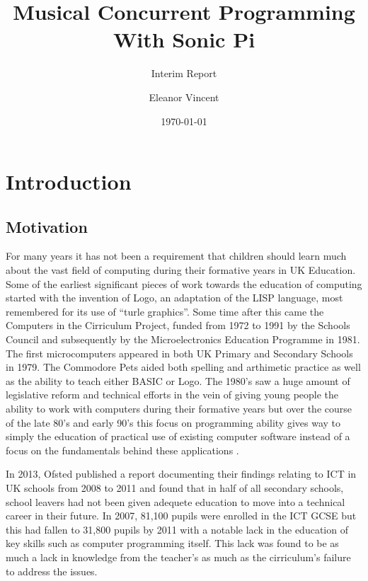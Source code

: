 \documentclass[11pt]{scrartcl}
\begin{document}
\title{Musical Concurrent Programming \\ With Sonic Pi}
\subtitle{Interim Report}
\author{Eleanor Vincent}
\date{\today}
\maketitle

\section{Introduction} %

\subsection{Motivation}
For many years it has not been a requirement that children should learn much
about the vast field of computing during their formative years in UK Education.
Some of the earliest significant pieces of work towards the education of
computing started with the invention of Logo, an adaptation of the LISP 
language, most remembered for its use of ``turle graphics''. Some time after 
this came the Computers in the Cirriculum Project, funded from 1972 to 1991 by 
the Schools Council and subsequently by the Microelectronics Education 
Programme in 1981. The first microcomputers appeared in both UK Primary and 
Secondary Schools in 1979. The Commodore Pets aided both spelling and 
arthimetic practice as well as the ability to teach either BASIC or Logo. The 
1980's saw a huge amount of legislative reform and technical efforts in the 
vein of giving young people the ability to work with computers during their 
formative years but over the course of the late 80's and early 90's this focus 
on programming ability gives way to simply the education of practical use of 
existing computer software instead of a focus on the fundamentals behind these 
applications \cite{naec}.

In 2013, Ofsted published a report documenting their findings relating to ICT 
in UK schools from 2008 to 2011 and found that in half of all secondary 
schools, school leavers had not been given adequete education to move into a 
technical career in their future. In 2007, 81,100 pupils were enrolled in the 
ICT GCSE but this had fallen to 31,800 pupils by 2011 \cite{DfEO13} with a 
notable lack in the education of key skills such as computer programming 
itself. This lack was found to be as much a lack in knowledge from the 
teacher's as much as the cirriculum's failure to address the issues.
\end{document}
